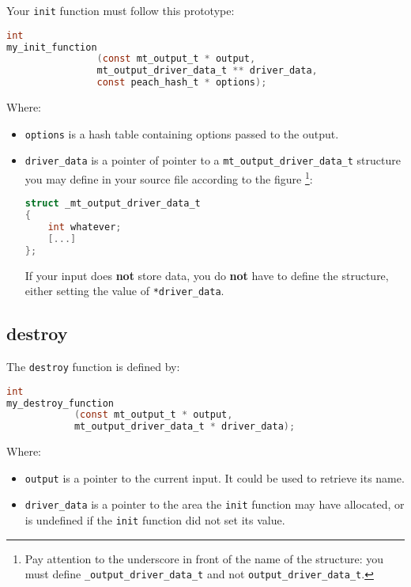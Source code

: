 Your \texttt{init} function must follow this prototype:
\begin{lstlisting}[language=C,
caption=Output's init function prototype]
int
my_init_function
                (const mt_output_t * output,
                mt_output_driver_data_t ** driver_data, 
                const peach_hash_t * options);
\end{lstlisting}
Where:
\begin{itemize}
\item \texttt{options} is a hash table containing options passed 
to the output.
\item \texttt{driver\_data} is a pointer of pointer to a 
\texttt{mt\_output\_driver\_data\_t} structure you may define in 
your source file according to the figure \footnote{Pay attention 
to the underscore in front of the name of the structure: you must define 
\texttt{\_output\_driver\_data\_t} and not
\texttt{output\_driver\_data\_t}.}:
\begin{lstlisting}[language=C,
caption=\_mt\_output\_driver\_data\_t structure]
struct _mt_output_driver_data_t
{
    int whatever;
    [...]
};
\end{lstlisting}
If your input does \textbf{not} store data, you do \textbf{not} have to define 
the structure, either setting the value of \texttt{*driver\_data}.
\end{itemize}

%
%
\subsection{destroy}
\label{sect:output_destroy}
The \texttt{destroy} function is defined by:
\begin{lstlisting}[language=C,
caption=Output's destroy function prototype]
int
my_destroy_function
            (const mt_output_t * output,
            mt_output_driver_data_t * driver_data);
\end{lstlisting}
Where:
\begin{itemize}
\item \texttt{output} is a pointer to the current input.
It could be used to retrieve its name.
\item \texttt{driver\_data} is a pointer to the area the 
\texttt{init} function may have allocated, or is undefined if 
the \texttt{init} function did not set its value.
\end{itemize}

